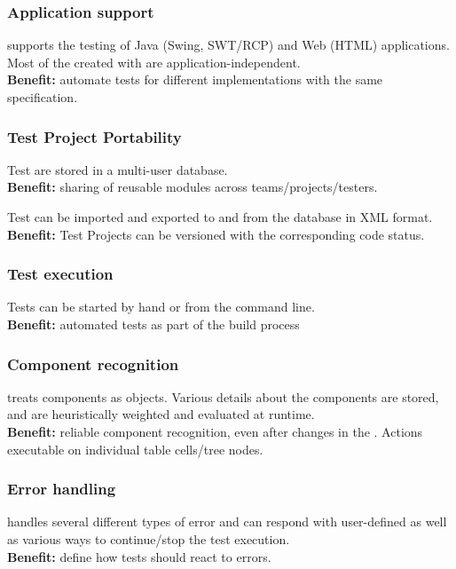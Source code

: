 
\subsubsection{Application support}
\gd{} supports the testing of Java (Swing, SWT/RCP) and Web (HTML) applications. Most of the \gdcases{} created with \gd{}  are application-independent. \\
\textbf{Benefit:} automate tests for different \gdaut{} implementations with the same specification.


\subsubsection{Test Project Portability}
Test \gdprojects{} are stored in a multi-user database.\\
\textbf{Benefit:} sharing of reusable modules across teams/projects/testers.
 
Test \gdprojects{} can be imported and exported to and from the database in XML format.\\
\textbf{Benefit:} Test Projects can be versioned with the corresponding code status. 

\subsubsection{Test execution}
Tests can be started by hand or from the command line. \\
 \textbf{Benefit:} automated tests as part of the build process

\subsubsection{Component recognition}
\gd{} treats components as objects. Various details about the components are stored, and are heuristically weighted and evaluated at runtime. \\

\textbf{Benefit:} reliable component recognition, even after changes in the \gdaut{}. Actions executable on individual table cells/tree nodes. 

\subsubsection{Error handling}
\gd{} handles several different types of error and can respond with user-defined \gdsteps{} as well as various ways to continue/stop the test execution. \\
\textbf{Benefit:} define how tests should react to errors. 

